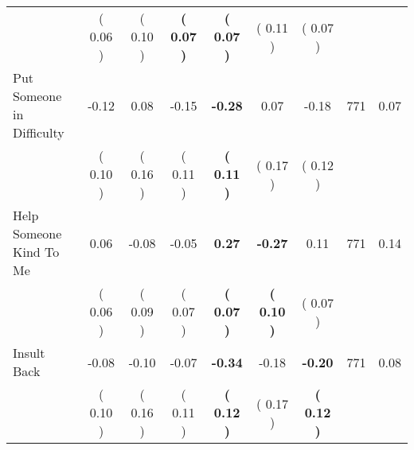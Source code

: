 \begin{tabular}{lcccccccc}
 & (     0.06 ) & (     0.10 ) & \textbf{(     0.07 )} & \textbf{(     0.07 )} & (     0.11 ) & (     0.07 ) & \\
Put Someone in Difficulty &     -0.12 &      0.08 &     -0.15 & \textbf{    -0.28} &      0.07 &     -0.18 & 771 &       0.07 \\ 
 & (     0.10 ) & (     0.16 ) & (     0.11 ) & \textbf{(     0.11 )} & (     0.17 ) & (     0.12 ) & \\
Help Someone Kind To Me &      0.06 &     -0.08 &     -0.05 & \textbf{     0.27} & \textbf{    -0.27} &      0.11 & 771 &       0.14 \\ 
 & (     0.06 ) & (     0.09 ) & (     0.07 ) & \textbf{(     0.07 )} & \textbf{(     0.10 )} & (     0.07 ) & \\
Insult Back &     -0.08 &     -0.10 &     -0.07 & \textbf{    -0.34} &     -0.18 & \textbf{    -0.20} & 771 &       0.08 \\ 
 & (     0.10 ) & (     0.16 ) & (     0.11 ) & \textbf{(     0.12 )} & (     0.17 ) & \textbf{(     0.12 )} & \\
\bottomrule
\end{tabular}
